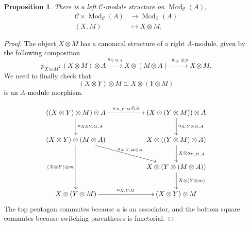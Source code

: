 \documentclass[a4paper, 10pt]{book}
\newtheorem{Prop}[theorem]{Proposition}
\theoremstyle{definition}
\numberwithin{equation}{chapter}
\newcommand\id{\operatorname{id}}
\newcommand\ot{\otimes}
\newcommand\Mod{\operatorname{Mod}}
\newcommand\C{\mathcal C}
\newcommand{\ra}\rightarrow
\begin{document}
\begin{Prop}
There is a left $\C$-module structure on $\Mod_\C(A)$, \begin{align}
	\C \times \Mod_\C(A) &\ra \Mod_\C(A)\\
     (X, M) &\mapsto X\ot M,
\end{align}
\end{Prop}
\begin{proof}
The object $X\otimes M$ has a canonical structure of a right $A$-module, given by the following composition \begin{equation}
	p_{X\otimes M}: (X\otimes M) \otimes A  \xrightarrow{a_{X, M, A}} X\otimes (M \otimes A) \xrightarrow{\id_X \otimes p} X\otimes M.
\end{equation}
We need to finally check that \begin{equation}
	(X\otimes Y) \otimes M \cong X\ot (Y\otimes M) 
\end{equation} is an $A$-module morphism.

\[
\xymatrix{((X\otimes Y ) \ot M)\ot A \ar[rr]^{a_{X, Y, M} \ot A} \ar[d]^{a_{X\ot Y, M , A}} & & (X\otimes(Y\ot M)) \ot A \ar[d]^{a_{X, Y\ot M, A}}\\
(X\ot Y) \ot (M\ot A)\ar[dd]_{(X\ot Y)\ot m} \ar[rrd]^{a_{X, Y, M\ot A}}&  & X\ot ((Y \ot M) \ot A) \ar[d]^{X\ot a_{Y, M, A}}\\
& & X\ot(Y\ot(M\ot A)) \ar[d]^{X\ot(Y\ot m)}\\
X\ot (Y\ot M) \ar[rr]^{a_{X, Y, M}} & & (X\ot Y)\ot M
}
\]
The top pentagon commutes because $a$ is an associator, and the bottom square commutes because switching parentheses is functorial.
\end{proof}
\end{document}
